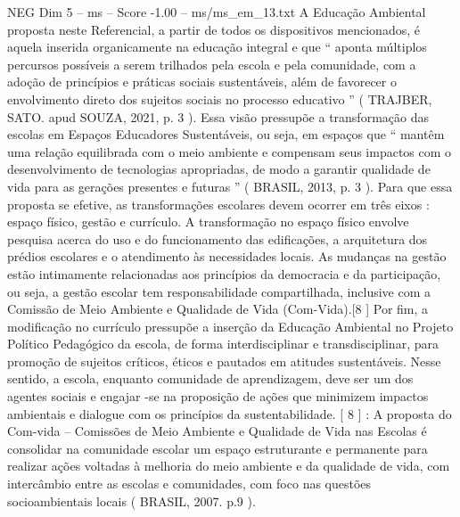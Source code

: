 \begin{textsample}{NEG Dim 5 – ms – Score -1.00 – ms/ms\_em\_13.txt}
A Educação Ambiental proposta neste Referencial, a partir de todos os dispositivos mencionados, é aquela inserida organicamente na educação integral e que “ aponta múltiplos percursos possíveis a serem trilhados pela escola e pela comunidade, com a adoção de princípios e práticas sociais sustentáveis, além de favorecer o envolvimento direto dos sujeitos sociais no processo educativo ” ( TRAJBER, SATO. apud SOUZA, 2021, p. 3 ).
Essa visão pressupõe a transformação das escolas em Espaços Educadores Sustentáveis, ou seja, em espaços que “ mantêm uma relação equilibrada com o meio ambiente e compensam seus impactos com o desenvolvimento de tecnologias apropriadas, de modo a garantir qualidade de vida para as gerações presentes e futuras ” ( BRASIL, 2013, p. 3 ).
Para que essa proposta se efetive, as transformações escolares devem ocorrer em três eixos : espaço físico, gestão e currículo.
A transformação no espaço físico envolve pesquisa acerca do uso e do funcionamento das edificações, a arquitetura dos prédios escolares e o atendimento às necessidades locais.
As mudanças na gestão estão intimamente relacionadas aos princípios da democracia e da participação, ou seja, a gestão escolar tem responsabilidade compartilhada, inclusive com a Comissão de Meio Ambiente e Qualidade de Vida (Com-Vida).[8 ] Por fim, a modificação no currículo pressupõe a inserção da Educação Ambiental no Projeto Político Pedagógico da escola, de forma interdisciplinar e transdisciplinar, para promoção de sujeitos críticos, éticos e pautados em atitudes sustentáveis.
Nesse sentido, a escola, enquanto comunidade de aprendizagem, deve ser um dos agentes sociais e engajar -se na proposição de ações que minimizem impactos ambientais e dialogue com os princípios da sustentabilidade. [ 8 ] : A proposta do Com-vida – Comissões de Meio Ambiente e Qualidade de Vida nas Escolas é consolidar na comunidade escolar um espaço estruturante e permanente para realizar ações voltadas à melhoria do meio ambiente e da qualidade de vida, com intercâmbio entre as escolas e comunidades, com foco nas questões socioambientais locais ( BRASIL, 2007. p.9 ).

\end{textsample}
